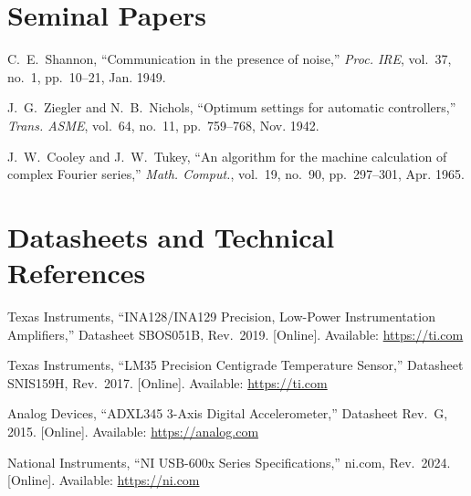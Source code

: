 \section*{Seminal Papers}

\begin{enumerate}[label={[\arabic*]},leftmargin=2em,resume]
\item C.~E.~Shannon, ``Communication in the presence of noise,'' \emph{Proc. IRE}, vol.~37, no.~1, pp.~10--21, Jan. 1949.
\item J.~G.~Ziegler and N.~B.~Nichols, ``Optimum settings for automatic controllers,'' \emph{Trans. ASME}, vol.~64, no.~11, pp.~759--768, Nov. 1942.
\item J.~W.~Cooley and J.~W.~Tukey, ``An algorithm for the machine calculation of complex Fourier series,'' \emph{Math. Comput.}, vol.~19, no.~90, pp.~297--301, Apr. 1965.
\end{enumerate}

\section*{Datasheets and Technical References}

\begin{enumerate}[label={[\arabic*]},leftmargin=2em,resume]
\item Texas Instruments, ``INA128/INA129 Precision, Low-Power Instrumentation Amplifiers,'' Datasheet SBOS051B, Rev.~2019. [Online]. Available: \url{https://ti.com}
\item Texas Instruments, ``LM35 Precision Centigrade Temperature Sensor,'' Datasheet SNIS159H, Rev.~2017. [Online]. Available: \url{https://ti.com}
\item Analog Devices, ``ADXL345 3-Axis Digital Accelerometer,'' Datasheet Rev.~G, 2015. [Online]. Available: \url{https://analog.com}
\item National Instruments, ``NI USB-600x Series Specifications,'' ni.com, Rev.~2024. [Online]. Available: \url{https://ni.com}
\end{enumerate}

